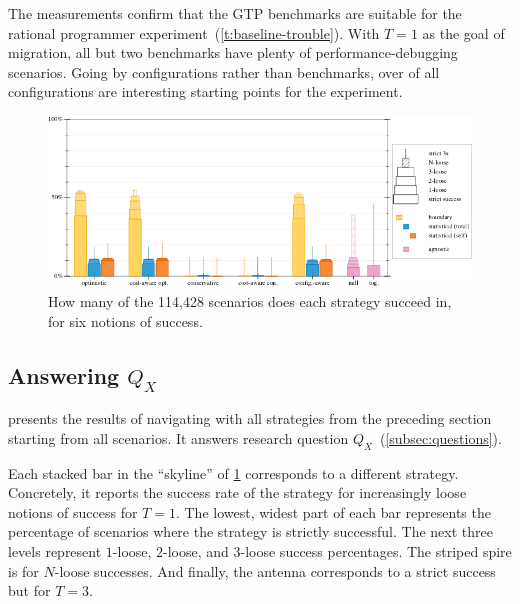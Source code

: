 The measurements confirm that the GTP benchmarks are suitable for
the rational programmer experiment~(\cref{t:baseline-trouble}).
With $T = 1$ as the goal of migration, all but two benchmarks
have plenty of performance-debugging scenarios.
Going by configurations rather than benchmarks, over  of all
configurations are interesting starting points for the experiment.

\begin{figure}[ht]
  \includegraphics[width=\columnwidth]{data/strategy-overall-feasible.pdf}
  \caption{How many of the 114,428 scenarios does each strategy succeed in, for six notions of success.}
  \label{f:strategy-overall}
\end{figure}

\subsection{Answering $Q_X$} \label{subsec:qx}

 presents the results of navigating with all strategies
from the preceding section starting from all scenarios. It answers
research question $Q_X$~(\cref{subsec:questions}).

Each stacked bar in the ``skyline'' of \cref{f:strategy-overall} corresponds to
a different strategy. Concretely, it reports the success
rate of the strategy for increasingly loose notions of success for $T = 1$.  The
lowest, widest part of each bar represents the percentage of scenarios where the
strategy is strictly successful. The next three levels represent $1$-loose,
$2$-loose, and $3$-loose success percentages.  The striped spire is for
$N$-loose successes.  And finally, the antenna corresponds to a
strict success but for $T = 3$.

